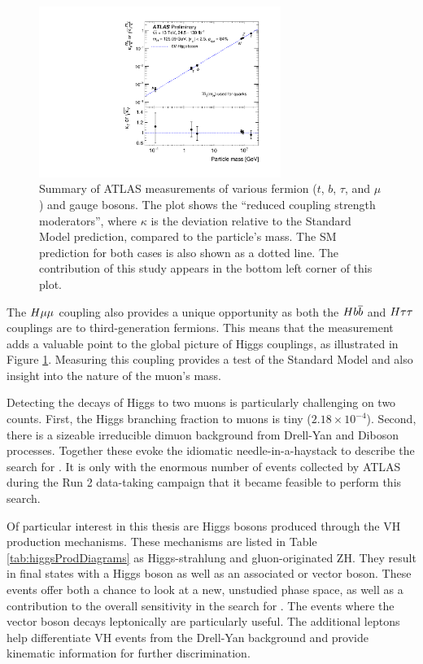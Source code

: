 \begin{figure}[h!]
\captionsetup[subfigure]{position=b}
\centering
\includegraphics[width=0.7\textwidth]{figures/hmumu/massCouplingPlot.pdf}
\caption{Summary of ATLAS measurements of various fermion ($t$, $b$, $\tau$, and $\mu$) and gauge bosons. The plot shows the ``reduced coupling strength moderators'', where $\kappa$ is the deviation relative to the Standard Model prediction, compared to the particle's mass.
The SM prediction for both cases is also shown as a dotted line.
The contribution of this study appears in the bottom left corner of this plot. 
}
\label{fig:higgsMassCoupling}
\end{figure}

The $H\mu\mu$ coupling also provides a unique opportunity as both the $Hb\overline{b}$ and $H\tau\tau$ couplings are to third-generation fermions.
This means that the \hmm measurement adds a valuable point to the global picture of Higgs couplings, as illustrated in Figure \ref{fig:higgsMassCoupling}.
Measuring this coupling provides a test of the Standard Model and also insight into the nature of the muon's mass.

Detecting the decays of Higgs to two muons is particularly challenging on two counts.
First, the Higgs branching fraction to muons is tiny ($2.18\times10^{-4}$).
Second, there is a sizeable irreducible dimuon background from Drell-Yan and Diboson processes.
Together these evoke the idiomatic needle-in-a-haystack to describe the search for \hmm.
It is only with the enormous number of events collected by ATLAS during the Run 2 data-taking campaign that it became feasible to perform this search.


Of particular interest in this thesis are Higgs bosons produced through the VH production mechanisms.
These mechanisms are listed in Table \ref{tab:higgsProdDiagrams} as Higgs-strahlung and gluon-originated ZH.
They result in final states with a Higgs boson as well as an associated \W or \Z vector boson.
These events offer both a chance to look at a new, unstudied phase space, as well as a contribution to the overall sensitivity in the search for \hmm.
The events where the vector boson decays leptonically are particularly useful.
The additional leptons help differentiate VH events from the Drell-Yan background and provide kinematic information for further discrimination.

